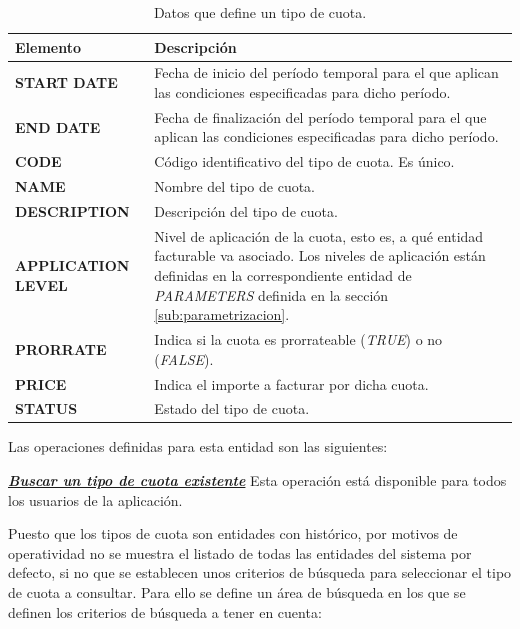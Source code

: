 \begin{table}[H]
  \centering
  \setlength{\leftmargini}{0.4cm}
  \resizebox{14cm}{!} {
  \begin{tabular}{|m{3cm} m{11cm}|}
  \rowcolor{udcpink!25}
  \hline
  	\textbf{Elemento} & \textbf{Descripción} \\\hline
  	\textbf{START DATE} & Fecha de inicio del período temporal para el que aplican las condiciones especificadas para dicho período.\\
  	\textbf{END DATE} & Fecha de finalización del período temporal para el que aplican las condiciones especificadas para dicho período.\\
  	\textbf{CODE} & Código identificativo del tipo de cuota. Es único.\\
	\textbf{NAME} & Nombre del tipo de cuota.\\
	\textbf{DESCRIPTION} & Descripción del tipo de cuota.\\
	\textbf{APPLICATION LEVEL} & Nivel de aplicación de la cuota, esto es, a qué entidad facturable va asociado. Los niveles de aplicación están definidas en la correspondiente entidad de \emph{PARAMETERS} definida en la sección \ref{sub:parametrizacion}.\\	
	\textbf{PRORRATE} & Indica si la cuota es prorrateable (\textit{TRUE}) o no (\textit{FALSE}).\\
	\textbf{PRICE} & Indica el importe a facturar por dicha cuota.\\
	\textbf{STATUS} & Estado del tipo de cuota.	
	\\\hline
  \end{tabular}
  } %
  \caption{Datos que define un tipo de cuota.}
  \label{tab:tipo-cuota}
\end{table}



Las operaciones definidas para esta entidad son las siguientes:

\underline{\textsl{\textbf{Buscar un tipo de cuota existente}}}\newline
Esta operación está disponible para todos los usuarios de la aplicación.

Puesto que los tipos de cuota son entidades con histórico, por motivos de operatividad no se muestra el listado de todas las entidades del sistema por defecto, si no que se establecen unos criterios de búsqueda para seleccionar el tipo de cuota a consultar. Para ello se define un área de búsqueda en los que se definen los criterios de búsqueda a tener en cuenta:

